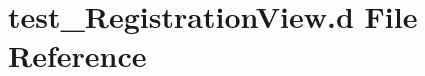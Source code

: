 \hypertarget{test___registration_view_8d}{}\section{test\+\_\+\+Registration\+View.\+d File Reference}
\label{test___registration_view_8d}
